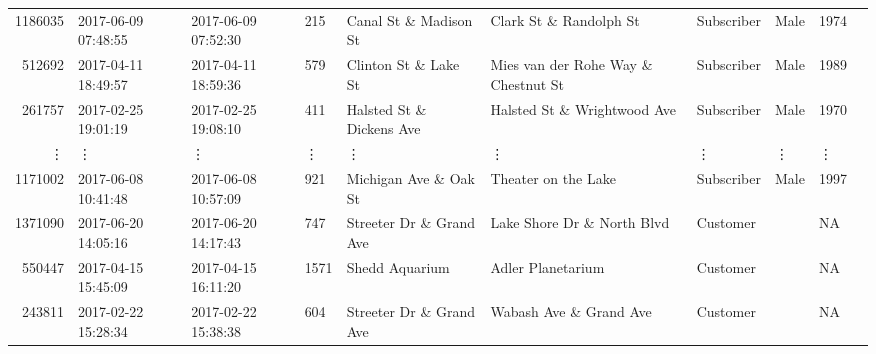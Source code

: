 \documentclass[11pt]{article}
\begin{document}
\begin{description}
\begin{tabular}{r|lllllllll}
	 1186035                                & 2017-06-09 07:48:55                    & 2017-06-09 07:52:30                    &  215                                   & Canal St \& Madison St                & Clark St \& Randolph St               & Subscriber                             & Male                                   & 1974                                  \\
	  512692                                & 2017-04-11 18:49:57                    & 2017-04-11 18:59:36                    &  579                                   & Clinton St \& Lake St                 & Mies van der Rohe Way \& Chestnut St  & Subscriber                             & Male                                   & 1989                                  \\
	  261757                                & 2017-02-25 19:01:19                    & 2017-02-25 19:08:10                    &  411                                   & Halsted St \& Dickens Ave             & Halsted St \& Wrightwood Ave          & Subscriber                             & Male                                   & 1970                                  \\
	 ⋮ & ⋮ & ⋮ & ⋮ & ⋮ & ⋮ & ⋮ & ⋮ & ⋮\\
	 1171002                           & 2017-06-08 10:41:48               & 2017-06-08 10:57:09               &  921                              & Michigan Ave \& Oak St           & Theater on the Lake               & Subscriber                        & Male                              & 1997                             \\
	 1371090                             & 2017-06-20 14:05:16                 & 2017-06-20 14:17:43                 &  747                                & Streeter Dr \& Grand Ave           & Lake Shore Dr \& North Blvd        & Customer                            &                                     &   NA                               \\
	  550447                           & 2017-04-15 15:45:09               & 2017-04-15 16:11:20               & 1571                              & Shedd Aquarium                    & Adler Planetarium                 & Customer                          &                                   &   NA                             \\
	  243811                             & 2017-02-22 15:28:34                 & 2017-02-22 15:38:38                 &  604                                & Streeter Dr \& Grand Ave           & Wabash Ave \& Grand Ave            & Customer                            &                                     &   NA                               \\

\end{tabular}
\end{description}
\end{document}
